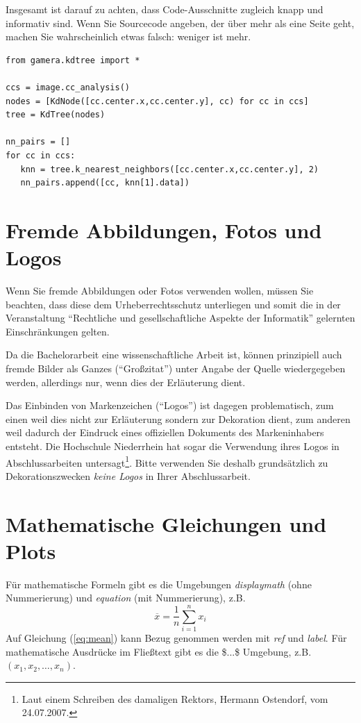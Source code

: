 \documentclass[12pt]{article}
\begin{document}
Insgesamt ist darauf zu achten, dass Code-Ausschnitte zugleich knapp und
informativ sind. Wenn Sie Sourcecode angeben, der über mehr als eine Seite
geht, machen Sie wahrscheinlich etwas falsch: weniger ist mehr.

\lstset{language=Python,
  basicstyle=\small \ttfamily,
  frame=bottomline,
  floatplacement=t!,
  aboveskip=0pt,
  captionpos=b
}
\begin{lstlisting}[float, caption={Beispiel für ein Code-Listing (aus \cite{dalitz09}).},
	label=lst:sample]
from gamera.kdtree import *

ccs = image.cc_analysis()
nodes = [KdNode([cc.center.x,cc.center.y], cc) for cc in ccs]
tree = KdTree(nodes)

nn_pairs = []
for cc in ccs:
   knn = tree.k_nearest_neighbors([cc.center.x,cc.center.y], 2)
   nn_pairs.append([cc, knn[1].data])
\end{lstlisting}

\section{Fremde Abbildungen, Fotos und Logos}
Wenn Sie fremde Abbildungen oder Fotos verwenden wollen, müssen Sie
beachten, dass diese dem Urheberrechtsschutz unterliegen und somit die
in der Veranstaltung ``Rechtliche und gesellschaftliche Aspekte der
Informatik'' \cite{rga} gelernten Einschränkungen gelten.

Da die Bachelorarbeit eine wissenschaftliche Arbeit ist, können prinzipiell
auch fremde Bilder als Ganzes (``Großzitat'') unter Angabe der Quelle
wiedergegeben werden, allerdings nur, wenn dies der Erläuterung dient.

Das Einbinden von Markenzeichen (``Logos'') ist dagegen problematisch, zum
einen weil dies nicht zur Erläuterung sondern zur Dekoration dient,
zum anderen weil dadurch der Eindruck eines offiziellen Dokuments des
Markeninhabers entsteht.
Die Hochschule Niederrhein hat sogar die Verwendung
ihres Logos in Abschlussarbeiten untersagt\footnote{Laut einem Schreiben des damaligen Rektors, Hermann Ostendorf, vom 24.07.2007.}. Bitte verwenden
Sie deshalb grundsätzlich zu Dekorationszwecken {\em keine Logos}
in Ihrer Abschlussarbeit.

\section{Mathematische Gleichungen und Plots}
Für mathematische Formeln gibt es die Umgebungen {\em displaymath} (ohne
Nummerierung) und {\em equation} (mit Nummerierung), z.B.
\begin{equation}
\label{eq:mean}
\overline{x} = \frac{1}{n}\sum_{i=1}^n x_i
\end{equation}
Auf Gleichung (\ref{eq:mean}) kann Bezug genommen werden mit {\em ref} und
{\em label}. Für mathematische Ausdrücke im Fließtext gibt es die \$...\$
Umgebung, z.B. $(x_1,x_2,\ldots,x_n)$.
\end{document}
